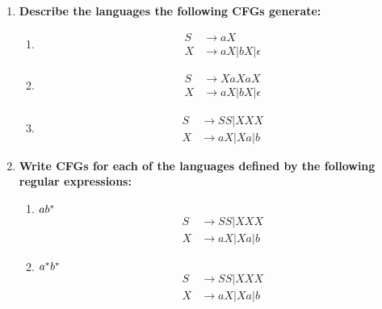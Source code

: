 

\begin{enumerate}

\item \textbf{Describe the languages the following CFGs generate:}

\begin{enumerate}
  \item
    \begin{equation*}
      \begin{aligned}
        S &\rightarrow aX \\
        X &\rightarrow aX | bX | \epsilon
      \end{aligned}
    \end{equation*}
  \item
    \begin{equation*}
      \begin{aligned}
        S &\rightarrow XaXaX \\
        X &\rightarrow aX | bX | \epsilon
      \end{aligned}
    \end{equation*}
  \item
    \begin{equation*}
      \begin{aligned}
        S &\rightarrow SS | XXX \\
        X &\rightarrow aX | Xa | b
      \end{aligned}
    \end{equation*}
\end{enumerate}

\newpage
\item \textbf{Write CFGs for each of the languages defined by the following regular expressions:}
\begin{enumerate}
	\item $ab{}^\ast$
    \begin{equation*}
      \begin{aligned}
        S &\rightarrow SS | XXX \\
        X &\rightarrow aX | Xa | b
      \end{aligned}
    \end{equation*}
	
	\item $a{}^\ast b{}^\ast$
    \begin{equation*}
      \begin{aligned}
        S &\rightarrow SS | XXX \\
        X &\rightarrow aX | Xa | b
      \end{aligned}
    \end{equation*}
	

\end{enumerate}
\end{enumerate}
